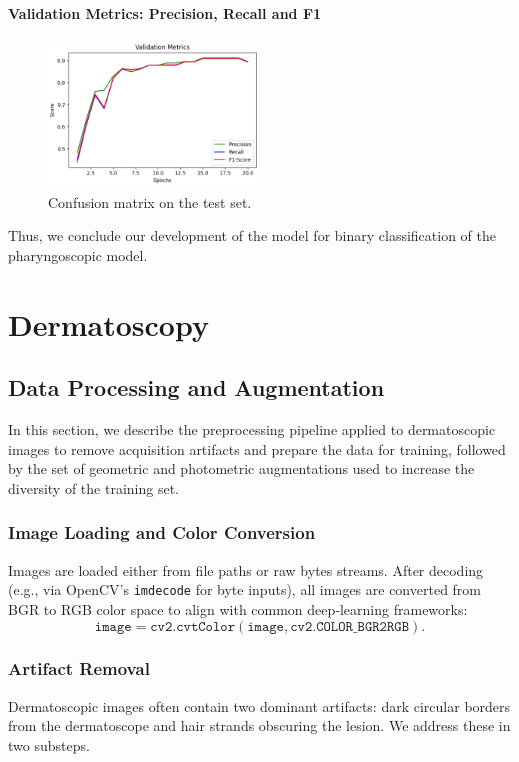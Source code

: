 \paragraph{Validation Metrics: Precision, Recall and F1}
\begin{figure}[h]
  \centering
  \includegraphics[width=0.5\textwidth]{images/phar_val_metrics.png}
  \caption{Confusion matrix on the test set.}
  \label{fig:phar_val_metrics}
\end{figure}
\par
 
Thus, we conclude our development of the model for binary classification of the pharyngoscopic model. 

\section{Dermatoscopy}

\subsection{Data Processing and Augmentation}

In this section, we describe the preprocessing pipeline applied to dermatoscopic images to remove acquisition artifacts and prepare the data for training, followed by the set of geometric and photometric augmentations used to increase the diversity of the training set.

\subsubsection{Image Loading and Color Conversion}
Images are loaded either from file paths or raw bytes streams. After decoding (e.g., via OpenCV’s \texttt{imdecode} for byte inputs), all images are converted from BGR to RGB color space to align with common deep‐learning frameworks:
\[
\texttt{image} = \texttt{cv2.cvtColor}(\texttt{image}, \texttt{cv2.COLOR\_BGR2RGB}).
\]

\subsubsection{Artifact Removal}
Dermatoscopic images often contain two dominant artifacts: dark circular borders from the dermatoscope and hair strands obscuring the lesion. We address these in two substeps.

